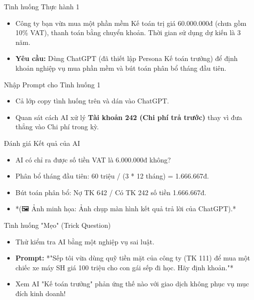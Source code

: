 \documentclass[aspectratio=169]{beamer}
\begin{document}
\begin{frame}{Tình huống Thực hành 1}
    \begin{itemize}
        \item Công ty bạn vừa mua một phần mềm Kế toán trị giá 60.000.000đ (chưa gồm 10\% VAT), thanh toán bằng chuyển khoản. Thời gian sử dụng dự kiến là 3 năm.
        \item \textbf{Yêu cầu:} Dùng ChatGPT (đã thiết lập Persona Kế toán trưởng) để định khoản nghiệp vụ mua phần mềm và bút toán phân bổ tháng đầu tiên.
    \end{itemize}
\end{frame}


\begin{frame}{Nhập Prompt cho Tình huống 1}
    \begin{itemize}
        \item Cả lớp copy tình huống trên và dán vào ChatGPT.
        \item Quan sát cách AI xử lý \textbf{Tài khoản 242 (Chi phí trả trước)} thay vì đưa thẳng vào Chi phí trong kỳ.
    \end{itemize}
\end{frame}


\begin{frame}{Đánh giá Kết quả của AI}
    \begin{itemize}
        \item AI có chỉ ra được số tiền VAT là 6.000.000đ không?
        \item Phân bổ tháng đầu tiên: 60 triệu / (3 * 12 tháng) = 1.666.667đ.
        \item Bút toán phân bổ: Nợ TK 642 / Có TK 242 số tiền 1.666.667đ.
        \item *(🖼️ Ảnh minh họa: Ảnh chụp màn hình kết quả trả lời của ChatGPT).*
    \end{itemize}
\end{frame}


\begin{frame}{Tình huống "Mẹo" (Trick Question)}
    \begin{itemize}
        \item Thử kiểm tra AI bằng một nghiệp vụ sai luật.
        \item \textbf{Prompt:} *"Sếp tôi vừa dùng quỹ tiền mặt của công ty (TK 111) để mua một chiếc xe máy SH giá 100 triệu cho con gái sếp đi học. Hãy định khoản."*
        \item Xem AI "Kế toán trưởng" phản ứng thế nào với giao dịch không phục vụ mục đích kinh doanh!
    \end{itemize}
\end{frame}
\end{document}

